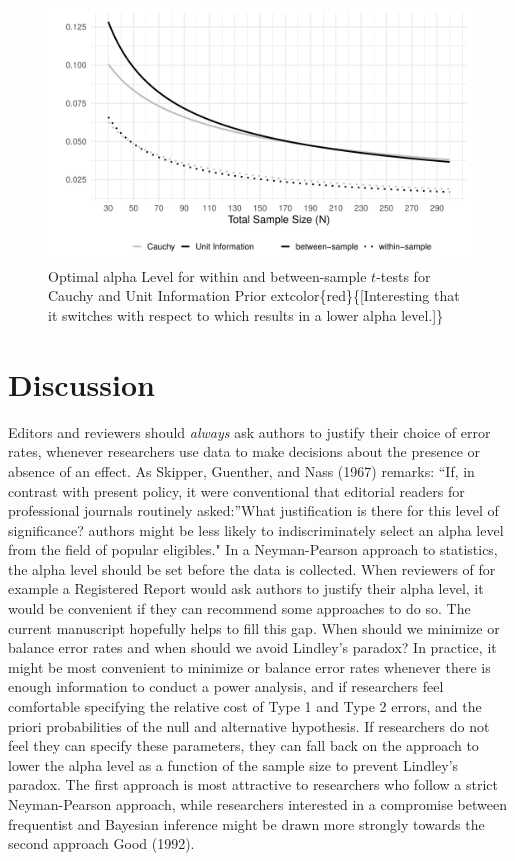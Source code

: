 \documentclass[
  english,
  ,jou, a4paper,floatsintext]{apa6}
\begin{document}
\begin{figure}
\centering
\includegraphics{Justify_in_Practice_files/figure-latex/lindley-1.pdf}
\caption{\label{fig:lindley}Optimal alpha Level for within and between-sample \(t\)-tests for Cauchy and Unit Information Prior extcolor\{red\}\{{[}Interesting that it switches with respect to which results in a lower alpha level.{]}\}}
\end{figure}

\hypertarget{discussion}{%
\section{Discussion}\label{discussion}}

Editors and reviewers should \emph{always} ask authors to justify their choice of error rates, whenever researchers use data to make decisions about the presence or absence of an effect. As Skipper, Guenther, and Nass (1967) remarks: ``If, in contrast with present policy, it were conventional that editorial readers for professional journals routinely asked:''What justification is there for this level of significance? authors might be less likely to indiscriminately select an alpha level from the field of popular eligibles." In a Neyman-Pearson approach to statistics, the alpha level should be set before the data is collected. When reviewers of for example a Registered Report would ask authors to justify their alpha level, it would be convenient if they can recommend some approaches to do so. The current manuscript hopefully helps to fill this gap.
When should we minimize or balance error rates and when should we avoid Lindley's paradox? In practice, it might be most convenient to minimize or balance error rates whenever there is enough information to conduct a power analysis, and if researchers feel comfortable specifying the relative cost of Type 1 and Type 2 errors, and the priori probabilities of the null and alternative hypothesis. If researchers do not feel they can specify these parameters, they can fall back on the approach to lower the alpha level as a function of the sample size to prevent Lindley's paradox. The first approach is most attractive to researchers who follow a strict Neyman-Pearson approach, while researchers interested in a compromise between frequentist and Bayesian inference might be drawn more strongly towards the second approach Good (1992).
\end{document}
